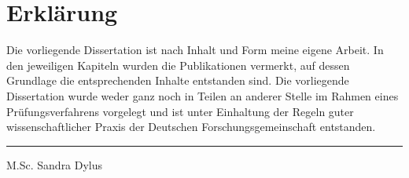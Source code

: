 \chapter*{Erkl\"arung}

Die vorliegende Dissertation ist nach Inhalt und Form meine eigene Arbeit.
In den jeweiligen Kapiteln wurden die Publikationen vermerkt, auf dessen Grundlage die entsprechenden Inhalte entstanden sind.
Die vorliegende Dissertation wurde weder ganz noch in Teilen an anderer Stelle im Rahmen eines Pr\"ufungsverfahrens vorgelegt und ist unter Einhaltung der Regeln guter wissenschaftlicher Praxis der Deutschen Forschungsgemeinschaft entstanden.

\vskip 10mm
\noindent
\rule{18em}{.3pt}
\newline
\hspace{1cm} M.Sc. Sandra Dylus